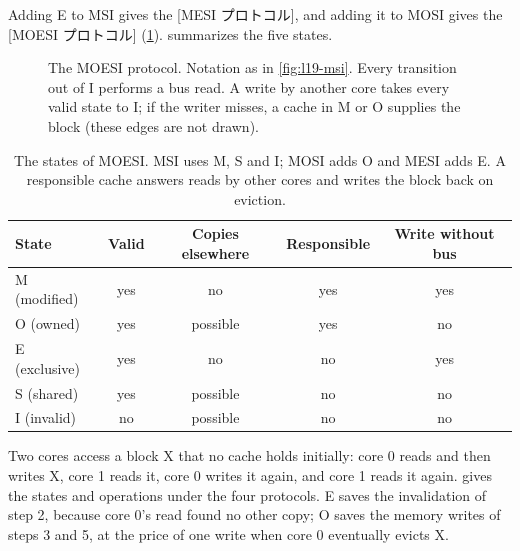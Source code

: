 \documentclass[../main.tex]{subfiles}
\begin{document}
Adding E to MSI gives the [MESI プロトコル], and adding
it to MOSI gives the [MOESI プロトコル]
(\cref{fig:l19-moesi}).   summarizes the five
states.

\begin{figure}[htbp]
  \centering
  
  \caption{The MOESI protocol.  Notation as in \cref{fig:l19-msi}.  Every
    transition out of I performs a bus read.  A write by another core takes
    every valid state to I; if the writer misses, a cache in M or O supplies
    the block (these edges are not drawn).}
  \label{fig:l19-moesi}
\end{figure}

\begin{table}[htbp]
  \centering\small
  \caption{The states of MOESI.  MSI uses M, S and I; MOSI adds O and MESI
    adds E.  A responsible cache answers reads by other cores and writes the
    block back on eviction.}
  \label{tab:l19-states}
  \begin{tabular}{@{}lcccc@{}}
    \toprule
    State & Valid & Copies elsewhere & Responsible & Write without bus \\
    \midrule
    M (modified)  & yes & no       & yes & yes \\
    O (owned)     & yes & possible & yes & no \\
    E (exclusive) & yes & no       & no  & yes \\
    S (shared)    & yes & possible & no  & no \\
    I (invalid)   & no  & possible & no  & no \\
    \bottomrule
  \end{tabular}
\end{table}

\begin{example}
  \label{ex:l19-protocols}
  Two cores access a block X that no cache holds initially: core 0 reads and
  then writes X, core 1 reads it, core 0 writes it again, and core 1 reads it
  again.   gives the states and operations under the
  four protocols.  E saves the invalidation of step 2, because core 0's read
  found no other copy; O saves the memory writes of steps 3 and 5, at the
  price of one write when core 0 eventually evicts X.
\end{example}
\end{document}
